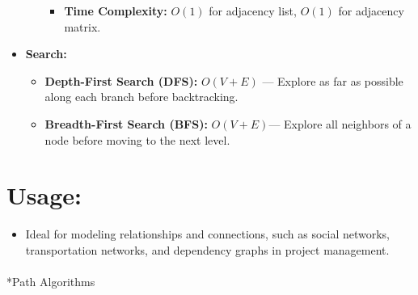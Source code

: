 \documentclass[
  letterpaper,
  DIV=11,
  numbers=noendperiod]{scrreprt}
\makeatletter
\let\oldparagraph\paragraph
\renewcommand{\paragraph}{
    \@ifstar
      \xxxParagraphStar
      \xxxParagraphNoStar
  }
\newcommand{\xxxParagraphStar}[1]{\oldparagraph*{#1}\mbox{}}
\newcommand{\xxxParagraphNoStar}[1]{\oldparagraph{#1}\mbox{}}
\providecommand{\tightlist}{%
  \setlength{\itemsep}{0pt}\setlength{\parskip}{0pt}}
\makeatother
\begin{document}
\begin{itemize}
\begin{itemize}
    \begin{itemize}
    \tightlist
    \item
      \textbf{Time Complexity:} \(O(1)\) for adjacency list, \(O(1)\)
      for adjacency matrix.
    \end{itemize}
  \end{itemize}
\item
  \textbf{Search:}

  \begin{itemize}
  \tightlist
  \item
    \textbf{Depth-First Search (DFS):} \(O(V+E)\) --- Explore as far as
    possible along each branch before backtracking.
  \item
    \textbf{Breadth-First Search (BFS):} \(O(V+E)\)--- Explore all
    neighbors of a node before moving to the next level.
  \end{itemize}
\end{itemize}

\section{Usage:}

\begin{itemize}
\tightlist
\item
  Ideal for modeling relationships and connections, such as social
  networks, transportation networks, and dependency graphs in project
  management.
\end{itemize}

\paragraph*{Path Algorithms}\label{path-algorithms}
\end{document}
